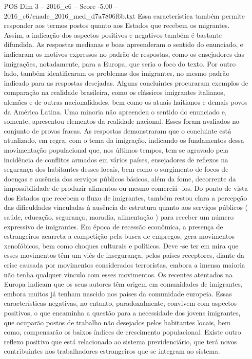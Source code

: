 \begin{textsample}{POS Dim 3 – 2016\_c6 – Score -5.00 – 2016\_c6/enade\_2016\_med\_d7a7806f6b.txt}
Essa característica também permite responder aos termos postos quanto aos Estados que recebem os migrantes.
Assim, a indicação dos aspectos positivos e negativos também é bastante difundida.
As respostas medianas e boas apreenderam o sentido do enunciado, e indicaram os motivos expressos no padrão de respostas, como os ensejadores das imigrações, notadamente, para a Europa, que seria o foco do texto.
Por outro lado, também identificaram os problemas dos imigrantes, no mesmo padrão indicado para as respostas desejadas.
Alguns concluintes procuraram exemplos de comparação na realidade brasileira, como os clássicos imigrantes italianos, alemães e de outras nacionalidades, bem como os atuais haitianos e demais povos da América Latina.
Uma minoria não apreendeu o sentido do enunciado e, somente, apresentou elementos da realidade nacional.
Esses foram avaliados no conjunto de provas fracas.
As respostas demonstraram que o concluinte está atualizado, em regra, com o tema da imigração, indicando os fundamentos dessa movimentação populacional que, nos últimos tempos, tem se agravado pela incidência de conflitos armados em vários países, ensejadores de reflexos na segurança dos habitantes desses locais, bem como o surgimento de focos de doenças e ausência dos serviços públicos básicos, além da fome, decorrente da impossibilidade de produzir alimentos ou mesmo comerciá -los.
Do ponto de vista dos Estados que recebem o fluxo de imigrantes, também restou clara a percepção das dificuldades vinculadas à ausência de estrutura quanto aos serviços públicos ( saúde, educação, segurança, moradia, alimentação ) para receber um número expressivo de imigrantes.
Em época de recessão econômica, a presença de estrangeiros acarreta a competição pela busca de empregos, gera movimentos xenofóbicos, bem como choques culturais e políticos.
Deve -se ter em mira que esses movimentos têm um viés de insegurança, pelos países receptores, diante da crise causada por movimentos considerados terroristas, embora a imensa maioria não tenha qualquer vínculo com esses movimentos.
Os recentes atentados na Europa indicam que os seus autores têm origem em comunidades de imigrantes, embora muitos já tenham nascido nos países da comunidade europeia.
Essas características negativas, no entanto, paradoxalmente, convivem com aspectos positivos, o que encaminha a questão para a necessidade dos jovens imigrantes, que ocuparão postos de trabalho não desejados pelos habitantes locais, bem como, compensarão os baixos índices de crescimento populacional.
Existe outro reflexo positivo que está relacionado ao sistema previdenciário, que terá novos contribuintes nos trabalhadores estrangeiros que se integram ao sistema.

\end{textsample}
